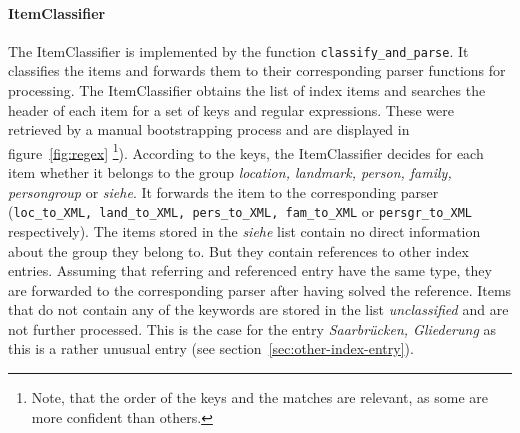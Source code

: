 \paragraph{ItemClassifier}
\label{sec:classifier}
The ItemClassifier is implemented by the function \texttt{classify\_and\_parse}. It classifies the items and forwards them to their corresponding parser functions for processing. The ItemClassifier obtains the list of index items and searches the header of each item for a set of keys and regular expressions. These were retrieved by a manual bootstrapping process and are displayed in figure~\ref{fig:regex} \footnote{Note, that the order of the keys and the matches are relevant, as some are more confident than others.}). According to the keys, the ItemClassifier decides for each item whether it belongs to the group \textit{location, landmark, person, family, persongroup} or \textit{siehe}. It forwards the item to the corresponding parser (\texttt{loc\_to\_XML, land\_to\_XML, pers\_to\_XML, fam\_to\_XML} or \texttt{persgr\_to\_XML} respectively). The items stored in the \textit{siehe} list contain no direct information about the group they belong to. But they contain references to other index entries. Assuming that referring and referenced entry have the same type, they are forwarded to the corresponding parser after having solved the reference. Items that do not contain any of the keywords are stored in the list \textit{unclassified} and are not further processed. This is the case for the entry \textit{Saarbrücken, Gliederung} as this is a rather unusual entry (see section~\ref{sec:other-index-entry}).

